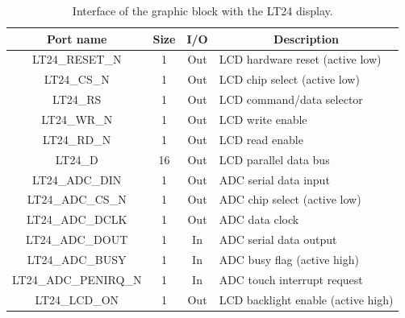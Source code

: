 \documentclass[11pt]{report}
\begin{document}
\begin{table}[!h]
\renewcommand{\arraystretch}{1.5}
\centering
\begin{tabular}{|c|c|c|p{60mm}|}
\hline
\textbf{Port name}   & \textbf{Size}    & \textbf{I/O}  & \multicolumn{1}{c|}{\textbf{Description}} \\ \hline
LT24\_RESET\_N       &  1               &  Out          &  LCD hardware reset (active low)                   \\ \hline
LT24\_CS\_N          &  1               &  Out          &  LCD chip select (active low)                   \\ \hline
LT24\_RS             &  1               &  Out          &  LCD command/data selector                    \\ \hline
LT24\_WR\_N          &  1               &  Out          &  LCD write enable                    \\ \hline
LT24\_RD\_N          &  1               &  Out          &  LCD read enable                    \\ \hline
LT24\_D              &  16              &  Out          &  LCD parallel data bus                    \\ \hline
LT24\_ADC\_DIN       &  1               &  Out          &  ADC serial data input                   \\ \hline
LT24\_ADC\_CS\_N     &  1               &  Out          &  ADC chip select (active low)                    \\ \hline
LT24\_ADC\_DCLK      &  1               &  Out          &  ADC data clock                    \\ \hline
LT24\_ADC\_DOUT      &  1               &  In           &  ADC serial data output                    \\ \hline
LT24\_ADC\_BUSY      &  1               &  In           &  ADC busy flag (active high)                    \\ \hline
LT24\_ADC\_PENIRQ\_N &  1               &  In           &  ADC touch interrupt request                    \\ \hline
LT24\_LCD\_ON        &  1               &  Out          &  LCD backlight enable (active high)                    \\ \hline


\end{tabular}
\label{tab:graphic_block_lt24_interface}
\caption{Interface of the graphic block with the LT24 display.}
\end{table}
\end{document}
